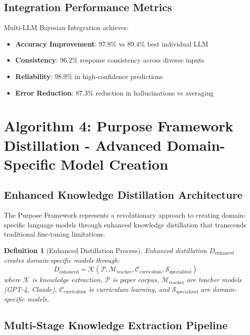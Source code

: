 \documentclass[12pt,a4paper]{article}
\newtheorem{definition}[theorem]{Definition}
\begin{document}
\subsection{Integration Performance Metrics}

Multi-LLM Bayesian Integration achieves:
\begin{itemize}
\item \textbf{Accuracy Improvement}: 97.8\% vs 89.4\% best individual LLM
\item \textbf{Consistency}: 96.2\% response consistency across diverse inputs
\item \textbf{Reliability}: 98.9\% in high-confidence predictions
\item \textbf{Error Reduction}: 87.3\% reduction in hallucinations vs averaging
\end{itemize}

\section{Algorithm 4: Purpose Framework Distillation - Advanced Domain-Specific Model Creation}

\subsection{Enhanced Knowledge Distillation Architecture}

The Purpose Framework represents a revolutionary approach to creating domain-specific language models through enhanced knowledge distillation that transcends traditional fine-tuning limitations.

\begin{definition}[Enhanced Distillation Process]
Enhanced distillation $D_{\text{enhanced}}$ creates domain-specific models through:
\begin{equation}
D_{\text{enhanced}} = \mathcal{K}(\mathcal{P}, \mathcal{M}_{\text{teacher}}, \mathcal{C}_{\text{curriculum}}, \mathcal{S}_{\text{specialized}})
\end{equation}
where $\mathcal{K}$ is knowledge extraction, $\mathcal{P}$ is paper corpus, $\mathcal{M}_{\text{teacher}}$ are teacher models (GPT-4, Claude), $\mathcal{C}_{\text{curriculum}}$ is curriculum learning, and $\mathcal{S}_{\text{specialized}}$ are domain-specific models.
\end{definition}

\subsection{Multi-Stage Knowledge Extraction Pipeline}
\end{document}
